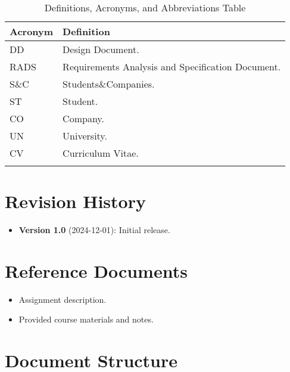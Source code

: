 \begin{longtable}{|l|p{}|}
      \hline
      \textbf{Acronym} & \textbf{Definition}                               \\
      \hline \hline
      DD               & Design Document.                                  \\
      \hline
      RADS             & Requirements Analysis and Specification Document. \\
      \hline
      S\&C             & Students\&Companies.                              \\
      \hline
      ST               & Student.                                          \\
      \hline
      CO               & Company.                                          \\
      \hline
      UN               & University.                                       \\
      \hline
      CV               & Curriculum Vitae.                                 \\
      \hline
      \caption{Definitions, Acronyms, and Abbreviations Table}
      \label{tab:definitions-acronyms-abbreviations}
\end{longtable}

\section{Revision History}
\label{sec:revision-history}%

\begin{itemize}
      \item \textbf{Version 1.0} (2024-12-01): Initial release.
\end{itemize}

\section{Reference Documents}
\label{sec:reference-documents}%

\begin{itemize}
      \item Assignment description.
      \item Provided course materials and notes.
\end{itemize}

\section{Document Structure}
\label{sec:document-structure}%

